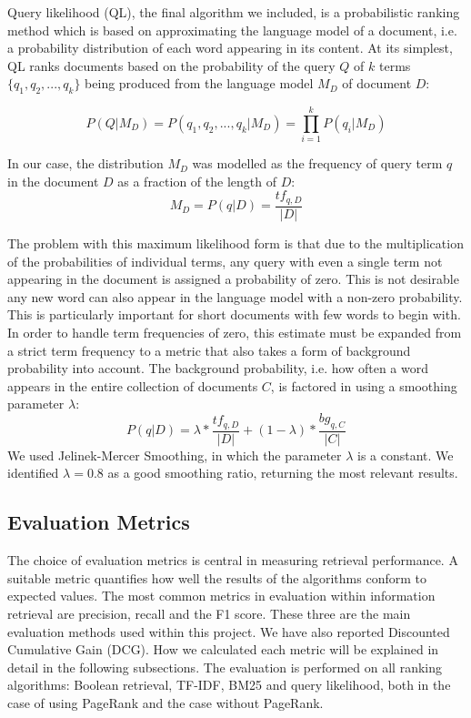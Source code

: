 Query likelihood (QL), the final algorithm we included, is a probabilistic ranking method which is based on approximating the language model of a document, i.e. a probability distribution of each word appearing in its content. At its simplest, QL ranks documents based on the probability of the query $Q$ of $k$ terms $\{q_1,q_2,...,q_k\}$ being produced from the language model $M_D$ of document $D$:

\[ P(Q | M_D) = P(q_1,q_2,...,q_k | M_D) = \prod_{i=1}^{k} P(q_i | M_D)\]

In our case, the distribution $M_D$ was modelled as the frequency of query term $q$ in the document $D$ as a fraction of the length of $D$:
\[ M_D = P(q | D) = \frac{tf_{q,D}}{|D|} \]

The problem with this maximum likelihood form is that due to the multiplication of the probabilities of individual terms, any query with even a single term not appearing in the document is assigned a probability of zero. This is not desirable any new word can also appear in the language model with a non-zero probability. This is particularly important for short documents with few words to begin with. In order to handle term frequencies of zero, this estimate must be expanded from a strict term frequency to a metric that also takes a form of background probability into account. The background probability, i.e. how often a word appears in the entire collection of documents $C$, is factored in using a smoothing parameter $\lambda$:
\[P(q | D) = \lambda * \frac{tf_{q,D}}{|D|} + (1 - \lambda) * \frac{bg_{q,C}}{|C|}\]
We used Jelinek-Mercer Smoothing, in which the parameter $\lambda$ is a constant. We identified $\lambda = 0.8$ as a good smoothing ratio, returning the most relevant results.




\subsection{Evaluation Metrics} %
\label{sub:metrics_&_analysis}

The choice of evaluation metrics is central in measuring retrieval performance. A suitable metric quantifies how well the results of the algorithms conform to expected values. The most common metrics in evaluation within information retrieval are precision, recall and the F1 score. These three are the main evaluation methods used within this project. We have also reported Discounted Cumulative Gain (DCG). How we calculated each metric will be explained in detail in the following subsections. The evaluation is performed on all ranking algorithms: Boolean retrieval, TF-IDF, BM25 and query likelihood, both in the case of using PageRank and the case without PageRank.


